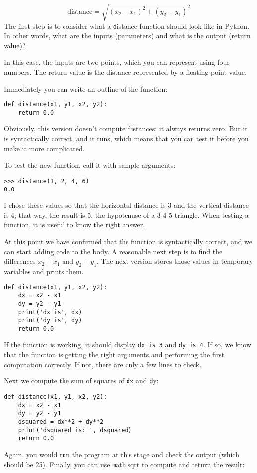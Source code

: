 \documentclass[
DIV=11,
fontsize=12,
twoside,
headinclude=false,
titlepage=firstiscover,
abstract=true,
headsepline=true,
footsepline=true,
chapterprefix=true, %
headings=big,
bibliography=totoc,%
captions=tableheading
]{scrbook}
\theoremstyle{definition}
\begin{document}
\begin{displaymath}
\mathrm{distance} = \sqrt{(x_2 - x_1)^2 + (y_2 - y_1)^2}
\end{displaymath}
%
The first step is to consider what a {\texttt distance} function should
look like in Python.  In other words, what are the inputs (parameters)
and what is the output (return value)?

In this case, the inputs are two points, which you can represent
using four numbers.  The return value is the distance represented by
a floating-point value.

Immediately you can write an outline of the function:

\begin{lstlisting}
def distance(x1, y1, x2, y2):
    return 0.0
\end{lstlisting}
%
Obviously, this version doesn't compute distances; it always returns
zero.  But it is syntactically correct, and it runs, which means that
you can test it before you make it more complicated.

To test the new function, call it with sample arguments:

\begin{lstlisting}
>>> distance(1, 2, 4, 6)
0.0
\end{lstlisting}
%
I chose these values so that the horizontal distance is 3 and the
vertical distance is 4; that way, the result is 5, the hypotenuse 
of a 3-4-5 triangle. When testing a function, it is
useful to know the right answer.

At this point we have confirmed that the function is syntactically
correct, and we can start adding code to the body.
A reasonable next step is to find the differences
$x_2 - x_1$ and $y_2 - y_1$.  The next version stores those values in
temporary variables and prints them.

\begin{lstlisting}
def distance(x1, y1, x2, y2):
    dx = x2 - x1
    dy = y2 - y1
    print('dx is', dx)
    print('dy is', dy)
    return 0.0
\end{lstlisting}
%
If the function is working, it should display \verb"dx is 3" and 
\verb"dy is 4".  If so, we know that the function is getting the right
arguments and performing the first computation correctly.  If not,
there are only a few lines to check.

Next we compute the sum of squares of {\texttt dx} and {\texttt dy}:

\begin{lstlisting}
def distance(x1, y1, x2, y2):
    dx = x2 - x1
    dy = y2 - y1
    dsquared = dx**2 + dy**2
    print('dsquared is: ', dsquared)
    return 0.0
\end{lstlisting}
%
Again, you would run the program at this stage and check the output
(which should be 25).
Finally, you can use {\texttt math.sqrt} to compute and return the result:
\end{document}
